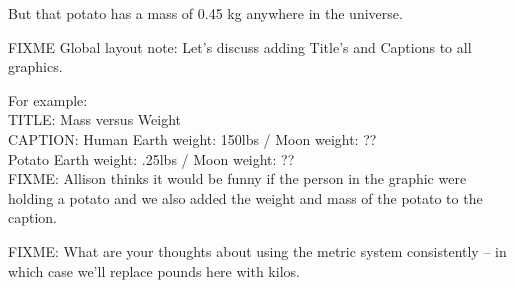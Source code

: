 But that potato has a mass of 0.45 kg anywhere in the universe.

FIXME Global layout note: Let's discuss adding Title's and Captions to all graphics.

For example:\\
TITLE: Mass versus Weight\\
CAPTION: Human Earth weight: 150lbs / Moon weight:  ??\\
Potato Earth weight: .25lbs / Moon weight: ??\\

FIXME: 
Allison thinks it would be funny if the person in the graphic were holding a potato and we also added the weight and mass of the  potato to the caption. 

FIXME: What are your thoughts about using the metric system consistently -- in which case we'll replace pounds here with kilos. 
